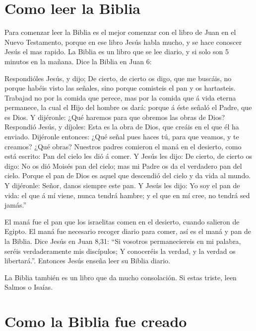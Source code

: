 \hypertarget{como-leer-la-biblia}{%
\section{Como leer la Biblia}\label{como-leer-la-biblia}}

Para comenzar leer la Biblia es el mejor comenzar con el libro de Juan
en el Nuevo Testamento, porque en ese libro Jesús habla mucho, y se hace
conoscer Jesús el mas rapido. La Biblia es un libro que se lee diario, y
si solo son 5 minutos en la mañana. Dice la Biblia en Juan 6:

Respondióles Jesús, y dijo; De cierto, de cierto os digo,
que me buscáis, no porque habéis visto las señales, sino porque
comisteis el pan y os hartasteis.  Trabajad no por la
comida que perece, mas por la comida que á vida eterna permanece, la
cual el Hijo del hombre os dará: porque á éste señaló el Padre, que es
Dios.  Y dijéronle: ¿Qué haremos para que obremos las obras
de Dios?  Respondió Jesús, y díjoles: Esta es la obra de
Dios, que creáis en el que él ha enviado.  Dijéronle
entonces: ¿Qué señal pues haces tú, para que veamos, y te creamos? ¿Qué
obras?  Nuestros padres comieron el maná en el desierto,
como está escrito: Pan del cielo les dió á comer.  Y Jesús
les dijo: De cierto, de cierto os digo: No os dió Moisés pan del cielo;
mas mi Padre os da el verdadero pan del cielo.  Porque el
pan de Dios es aquel que descendió del cielo y da vida al mundo.
 Y dijéronle: Señor, danos siempre este pan. 
Y Jesús les dijo: Yo soy el pan de vida: el que á mí viene, nunca tendrá
hambre; y el que en mí cree, no tendrá sed jamás.''

El maná fue el pan que los israelitas comen en el desierto, cuando
salieron de Egipto. El maná fue necesario recoger diario para comer, así
es el maná y pan de la Biblia. Dice Jesús en Juan 8,31: ``Si vosotros
permaneciereis en mi palabra, seréis verdaderamente mis discípulos; Y
conoceréis la verdad, y la verdad os libertará.''. Entonces Jesús enseña
leer su Biblia diario.

La Biblia también es un libro que da mucho consolación. Si estas triste,
leen Salmos o Isaías.

\hypertarget{como-la-biblia-fue-creado}{%
\section{Como la Biblia fue creado}\label{como-la-biblia-fue-creado}}

